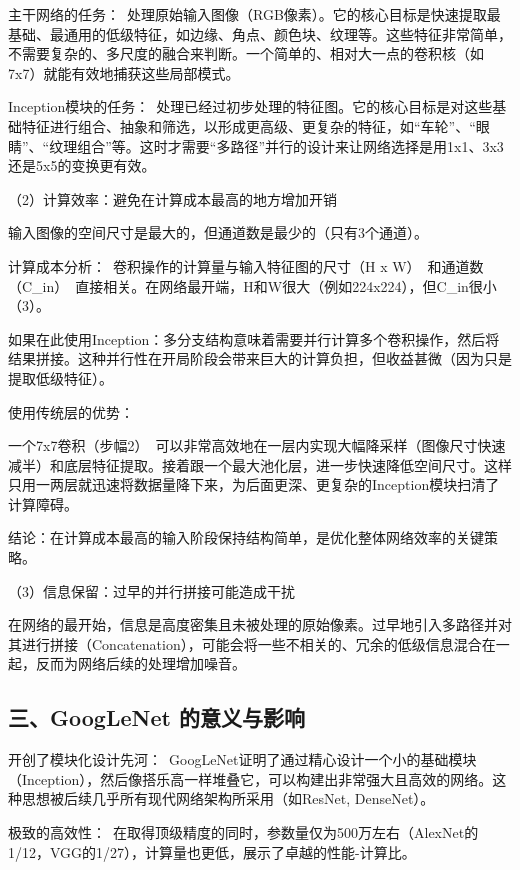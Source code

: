主干网络的任务：~处理原始输入图像（RGB像素）。它的核心目标是快速提取最基础、最通用的低级特征，如边缘、角点、颜色块、纹理等。这些特征非常简单，不需要复杂的、多尺度的融合来判断。一个简单的、相对大一点的卷积核（如7x7）就能有效地捕获这些局部模式。

Inception模块的任务：~处理已经过初步处理的特征图。它的核心目标是对这些基础特征进行组合、抽象和筛选，以形成更高级、更复杂的特征，如``车轮''、``眼睛''、``纹理组合''等。这时才需要``多路径''并行的设计来让网络选择是用1x1、3x3还是5x5的变换更有效。

（2）计算效率：避免在计算成本最高的地方增加开销

输入图像的空间尺寸是最大的，但通道数是最少的（只有3个通道）。

计算成本分析：~卷积操作的计算量与输入特征图的尺寸（H x W）~和通道数（C\_in）~直接相关。在网络最开端，H和W很大（例如224x224），但C\_in很小（3）。

如果在此使用Inception：多分支结构意味着需要并行计算多个卷积操作，然后将结果拼接。这种并行性在开局阶段会带来巨大的计算负担，但收益甚微（因为只是提取低级特征）。

使用传统层的优势：

一个7x7卷积（步幅2）~可以非常高效地在一层内实现大幅降采样（图像尺寸快速减半）和底层特征提取。接着跟一个最大池化层，进一步快速降低空间尺寸。这样只用一两层就迅速将数据量降下来，为后面更深、更复杂的Inception模块扫清了计算障碍。

结论：在计算成本最高的输入阶段保持结构简单，是优化整体网络效率的关键策略。

（3）信息保留：过早的并行拼接可能造成干扰

在网络的最开始，信息是高度密集且未被处理的原始像素。过早地引入多路径并对其进行拼接（Concatenation），可能会将一些不相关的、冗余的低级信息混合在一起，反而为网络后续的处理增加噪音。

\hypertarget{ux4e09googlenet-ux7684ux610fux4e49ux4e0eux5f71ux54cd}{%
\subsection{三、GoogLeNet 的意义与影响}\label{ux4e09googlenet-ux7684ux610fux4e49ux4e0eux5f71ux54cd}}

开创了模块化设计先河：~GoogLeNet证明了通过精心设计一个小的基础模块（Inception），然后像搭乐高一样堆叠它，可以构建出非常强大且高效的网络。这种思想被后续几乎所有现代网络架构所采用（如ResNet, DenseNet）。

极致的高效性：~在取得顶级精度的同时，参数量仅为500万左右（AlexNet的1/12，VGG的1/27），计算量也更低，展示了卓越的性能-计算比。

